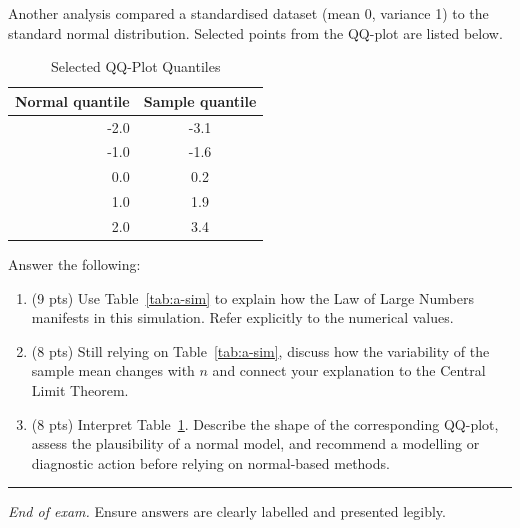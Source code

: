 \documentclass[11pt]{article}
\begin{document}
Another analysis compared a standardised dataset (mean 0, variance 1) to the standard normal distribution. Selected points from the QQ-plot are listed below.

\begin{table}[h]
\centering
\caption{Selected QQ-Plot Quantiles}\label{tab:a-qq}
\begin{tabular}{@{}rc@{}}
\toprule
\textbf{Normal quantile} & \textbf{Sample quantile}\\
\midrule
-2.0 & -3.1 \\
-1.0 & -1.6 \\
 0.0 &  0.2 \\
 1.0 &  1.9 \\
 2.0 &  3.4 \\
\bottomrule
\end{tabular}
\end{table}

\medskip
Answer the following:
\begin{enumerate}
  \item (9 pts) Use Table~\ref{tab:a-sim} to explain how the Law of Large Numbers manifests in this simulation. Refer explicitly to the numerical values.
  \item (8 pts) Still relying on Table~\ref{tab:a-sim}, discuss how the variability of the sample mean changes with $n$ and connect your explanation to the Central Limit Theorem.
  \item (8 pts) Interpret Table~\ref{tab:a-qq}. Describe the shape of the corresponding QQ-plot, assess the plausibility of a normal model, and recommend a modelling or diagnostic action before relying on normal-based methods.
\end{enumerate}

\vspace{0.75em}
\hrule
\vspace{0.25em}

\noindent\textit{End of exam.} Ensure answers are clearly labelled and presented legibly.
\end{document}
